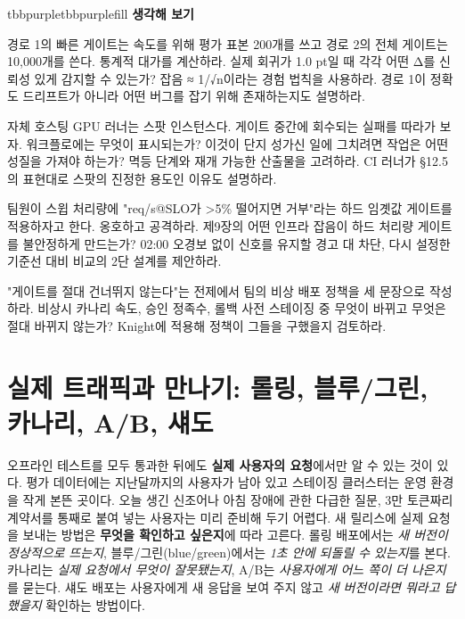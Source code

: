 \begin{calloutbox}{tbbpurple}{tbbpurplefill}
{\normalsize\bfseries\color{tbbpurple}생각해 보기}\par\vspace{3pt}
\begin{tbbitemize}
  \item 경로 1의 빠른 게이트는 속도를 위해 평가 표본 200개를 쓰고 경로 2의 전체 게이트는 10,000개를 쓴다. 통계적 대가를 계산하라. 실제 회귀가 1.0 pt일 때 각각 어떤 Δ를 신뢰성 있게 감지할 수 있는가? 잡음 ≈ 1/√n이라는 경험 법칙을 사용하라. 경로 1이 정확도 드리프트가 아니라 어떤 버그를 잡기 위해 존재하는지도 설명하라.
  \item 자체 호스팅 GPU 러너는 스팟 인스턴스다. 게이트 중간에 회수되는 실패를 따라가 보자. 워크플로에는 무엇이 표시되는가? 이것이 단지 성가신 일에 그치려면 작업은 어떤 성질을 가져야 하는가? 멱등 단계와 재개 가능한 산출물을 고려하라. CI 러너가 §12.5의 표현대로 스팟의 진정한 용도인 이유도 설명하라.
  \item 팀원이 스윕 처리량에 "req/s@SLO가 >5\% 떨어지면 거부"라는 하드 임곗값 게이트를 적용하자고 한다. 옹호하고 공격하라. 제9장의 어떤 인프라 잡음이 하드 처리량 게이트를 불안정하게 만드는가? 02:00 오경보 없이 신호를 유지할 경고 대 차단, 다시 설정한 기준선 대비 비교의 2단 설계를 제안하라.
  \item "게이트를 절대 건너뛰지 않는다"는 전제에서 팀의 비상 배포 정책을 세 문장으로 작성하라. 비상시 카나리 속도, 승인 정족수, 롤백 사전 스테이징 중 무엇이 바뀌고 무엇은 절대 바뀌지 않는가? Knight에 적용해 정책이 그들을 구했을지 검토하라.
\end{tbbitemize}
\end{calloutbox}

\section{실제 트래픽과 만나기: 롤링, 블루/그린, 카나리, A/B, 섀도}

오프라인 테스트를 모두 통과한 뒤에도 \textbf{실제 사용자의 요청}에서만 알 수 있는 것이 있다. 평가 데이터에는 지난달까지의 사용자가 남아 있고 스테이징 클러스터는 운영 환경을 작게 본뜬 곳이다. 오늘 생긴 신조어나 아침 장애에 관한 다급한 질문, 3만 토큰짜리 계약서를 통째로 붙여 넣는 사용자는 미리 준비해 두기 어렵다. 새 릴리스에 실제 요청을 보내는 방법은 \textbf{무엇을 확인하고 싶은지}에 따라 고른다. 롤링 배포에서는 \textit{새 버전이 정상적으로 뜨는지}, 블루/그린(blue/green)에서는 \textit{1초 안에 되돌릴 수 있는지}를 본다. 카나리는 \textit{실제 요청에서 무엇이 잘못됐는지}, A/B는 \textit{사용자에게 어느 쪽이 더 나은지}를 묻는다. 섀도 배포는 사용자에게 새 응답을 보여 주지 않고 \textit{새 버전이라면 뭐라고 답했을지} 확인하는 방법이다.

